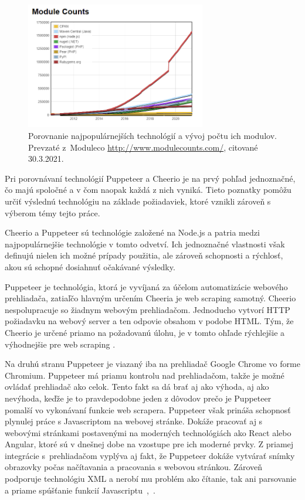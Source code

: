 \begin{figure}[hbt]
	\centering
	\includegraphics[width=0.7\textwidth]{obrazky-figures/modules.png}
	\caption{Porovnanie najpopulárnejších technológií a vývoj počtu ich modulov. Prevzaté z~Moduleco \url{http://www.modulecounts.com/}, citované 30.3.2021.}
	\label{Moduleco_img}
\end{figure}

\bigskip

Pri porovnávaní technológií Puppeteer a Cheerio je na prvý pohľad jednoznačné, čo majú spoločné a v čom naopak každá z nich vyniká. Tieto poznatky pomôžu určiť výslednú technológiu na základe požiadaviek, ktoré vznikli zároveň s výberom témy tejto práce.

Cheerio a Puppeteer sú technológie založené na Node.js a patria medzi najpopulárnejšie technológie v tomto odvetví. Ich jednoznačné vlastnosti však definujú nielen ich možné prípady použitia, ale zároveň schopnosti a rýchlosť, akou sú schopné dosiahnuť očakávané výsledky. 

\newpage

Puppeteer je technológia, ktorá je vyvíjaná za účelom automatizácie webového prehliadača, zatiaľčo hlavným určením Cheeria je web scraping samotný. Cheerio nespolupracuje so žiadnym webovým prehliadačom. Jednoducho vytvorí HTTP požiadavku na webový server a ten odpovie obsahom v podobe HTML. Tým, že Cheerio je určené priamo na požadovanú úlohu, je v tomto ohľade rýchlejšie a výhodnejšie pre web scraping \cite{cheerio}.

Na druhú stranu Puppeteer je viazaný iba na prehliadač Google Chrome vo forme Chromium. Puppeteer má priamu kontrolu nad prehliadačom, takže je možné ovládať prehliadač ako celok. Tento fakt sa dá brať aj ako výhoda, aj ako nevýhoda, keďže je to pravdepodobne jeden z dôvodov prečo je Puppeteer pomalší vo vykonávaní funkcie web scrapera. Puppeteer však prináša schopnosť plynulej práce s Javascriptom na webovej stránke. Dokáže pracovať aj s webovými stránkami postavenými na moderných technológiách ako React alebo Angular, ktoré sú v dnešnej dobe na vzostupe pre ich moderné prvky. Z priamej integrácie s~prehliadačom vyplýva aj fakt, že Puppeteer dokáže vytvárať snímky obrazovky počas načítavania a pracovania s webovou stránkou. Zároveň podporuje technológiu XML a nerobí mu problém ako čítanie, tak ani parsovanie a priame spúšťanie funkcií Javascriptu~\cite{puppeteer},~\cite{cheerio}. 

